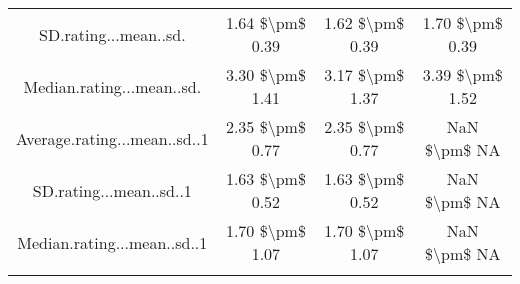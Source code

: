 \begin{table}[!htbp]
\begin{tabular}{@{\extracolsep{5pt}} cccc}
SD.rating...mean..sd. & 1.64 \$\textbackslash pm\$ 0.39 & 1.62 \$\textbackslash pm\$ 0.39 & 1.70 \$\textbackslash pm\$ 0.39 \\ 
Median.rating...mean..sd. & 3.30 \$\textbackslash pm\$ 1.41 & 3.17 \$\textbackslash pm\$ 1.37 & 3.39 \$\textbackslash pm\$ 1.52 \\ 
Average.rating...mean..sd..1 & 2.35 \$\textbackslash pm\$ 0.77 & 2.35 \$\textbackslash pm\$ 0.77 & NaN \$\textbackslash pm\$  NA \\ 
SD.rating...mean..sd..1 & 1.63 \$\textbackslash pm\$ 0.52 & 1.63 \$\textbackslash pm\$ 0.52 & NaN \$\textbackslash pm\$  NA \\ 
Median.rating...mean..sd..1 & 1.70 \$\textbackslash pm\$ 1.07 & 1.70 \$\textbackslash pm\$ 1.07 & NaN \$\textbackslash pm\$  NA \\ 
\hline \\[-1.8ex] 
\end{tabular} 
\end{table} 
